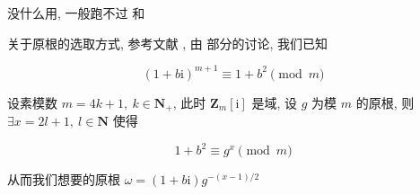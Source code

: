 没什么用, 一般跑不过  和 

关于原根的选取方式, 参考文献 \cite{ieee1451721}, 由  部分的讨论, 我们已知

\[
    \left(1+b\mathrm{i}\right)^{m+1}\equiv 1+b^2\pmod m
\]

设素模数 \(m=4k+1,~k\in\mathbf{N}_+\), 此时 \(\mathbf{Z}_m\left[\mathrm{i}\right]\) 是域, 设 \(g\) 为模 \(m\) 的原根, 则 \(\exists x=2l+1,~l\in\mathbf{N}\) 使得

\[
    1+b^2\equiv g^x\pmod m
\]

从而我们想要的原根 \(\omega=\left(1+b\mathrm{i}\right)g^{-(x-1)/2}\)

